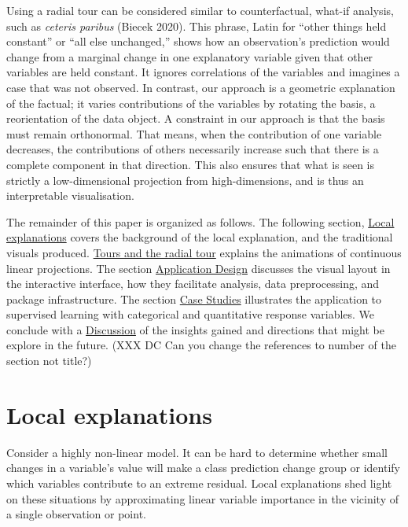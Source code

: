 \documentclass[
]{article}
\begin{document}
Using a radial tour can be considered similar to counterfactual, what-if
analysis, such as \emph{ceteris paribus} (Biecek 2020). This phrase,
Latin for ``other things held constant'' or ``all else unchanged,''
shows how an observation's prediction would change from a marginal
change in one explanatory variable given that other variables are held
constant. It ignores correlations of the variables and imagines a case
that was not observed. In contrast, our approach is a geometric
explanation of the factual; it varies contributions of the variables by
rotating the basis, a reorientation of the data object. A constraint in
our approach is that the basis must remain orthonormal. That means, when
the contribution of one variable decreases, the contributions of others
necessarily increase such that there is a complete component in that
direction. This also ensures that what is seen is strictly a
low-dimensional projection from high-dimensions, and is thus an
interpretable visualisation.

The remainder of this paper is organized as follows. The following
section, \protect\hyperlink{sec:explanations}{Local explanations} covers
the background of the local explanation, and the traditional visuals
produced. \protect\hyperlink{sec:tour}{Tours and the radial tour}
explains the animations of continuous linear projections. The section
\protect\hyperlink{sec:applicationdesign}{Application Design} discusses
the visual layout in the interactive interface, how they facilitate
analysis, data preprocessing, and package infrastructure. The section
\protect\hyperlink{sec:casestudies}{Case Studies} illustrates the
application to supervised learning with categorical and quantitative
response variables. We conclude with a
\protect\hyperlink{sec:cheemdiscussion}{Discussion} of the insights
gained and directions that might be explore in the future. (XXX DC Can
you change the references to number of the section not title?)

\hypertarget{sec:explanations}{%
\section{Local explanations}\label{sec:explanations}}

Consider a highly non-linear model. It can be hard to determine whether
small changes in a variable's value will make a class prediction change
group or identify which variables contribute to an extreme residual.
Local explanations shed light on these situations by approximating
linear variable importance in the vicinity of a single observation or
point.
\end{document}
